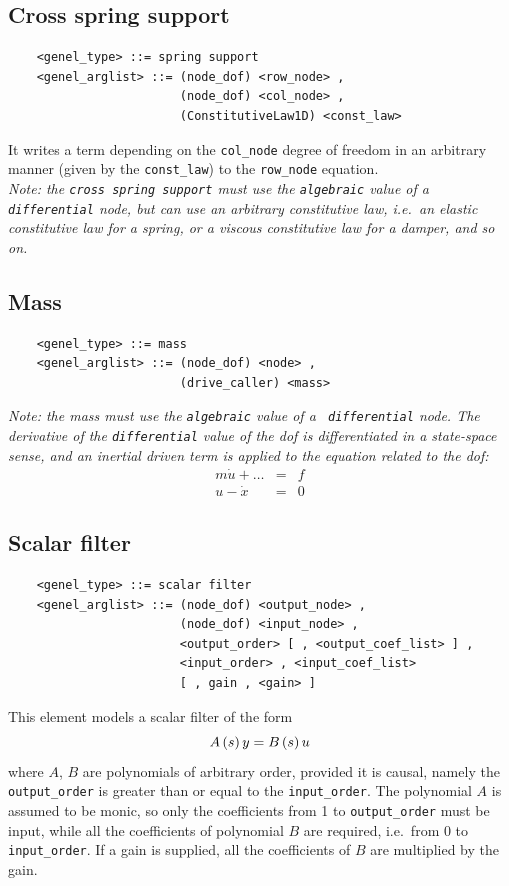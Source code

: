 \subsection{Cross spring support}
\begin{verbatim}
    <genel_type> ::= spring support
    <genel_arglist> ::= (node_dof) <row_node> ,                      
                        (node_dof) <col_node> ,                      
                        (ConstitutiveLaw1D) <const_law>
\end{verbatim}
It writes a term depending on the \texttt{col\_node} degree of freedom in an
arbitrary manner (given by the \texttt{const\_law}) to the 
\texttt{row\_node} equation. \\
{\em
    Note: the \texttt{cross spring support} must use the \texttt{algebraic} value
    of a \texttt{differential} node, but can use an arbitrary constitutive law,
    i.e.\ an elastic constitutive law for a spring, or a viscous
    constitutive law for a damper, and so on.
}

\subsection{Mass}
\begin{verbatim}
    <genel_type> ::= mass
    <genel_arglist> ::= (node_dof) <node> ,                     
                        (drive_caller) <mass>
\end{verbatim}
{\em
    Note: the mass must use the \texttt{algebraic} value of a {\tt
    differential} node. The derivative of the \texttt{differential} value of
    the dof is differentiated in a state-space sense, and an inertial driven
    term is applied to the equation related to the dof:
    \begin{eqnarray*}
        m\dot{u} + \ldots & = & f \\
	u - \dot{x} & = & 0
    \end{eqnarray*}
}

\subsection{Scalar filter}
\begin{verbatim}
    <genel_type> ::= scalar filter
    <genel_arglist> ::= (node_dof) <output_node> ,
                        (node_dof) <input_node> ,
                        <output_order> [ , <output_coef_list> ] ,
                        <input_order> , <input_coef_list>
                        [ , gain , <gain> ]
\end{verbatim}
This element models a scalar filter of the form
\begin{displaymath}
    A\left( s \right)y = B\left( s \right)u
\end{displaymath}
where $ A $, $ B $ are polynomials of arbitrary order, provided it is
causal, namely the \texttt{output\_order} is greater than or equal to 
the \texttt{input\_order}.
The polynomial $ A $ is assumed to be monic, so only the coefficients
from 1 to \texttt{output\_order} must be input, while all the coefficients 
of polynomial $ B $ are required, i.e.\ from 0 to \texttt{input\_order}.
If a gain is supplied, all the coefficients of $ B $ are multiplied by the
gain.

